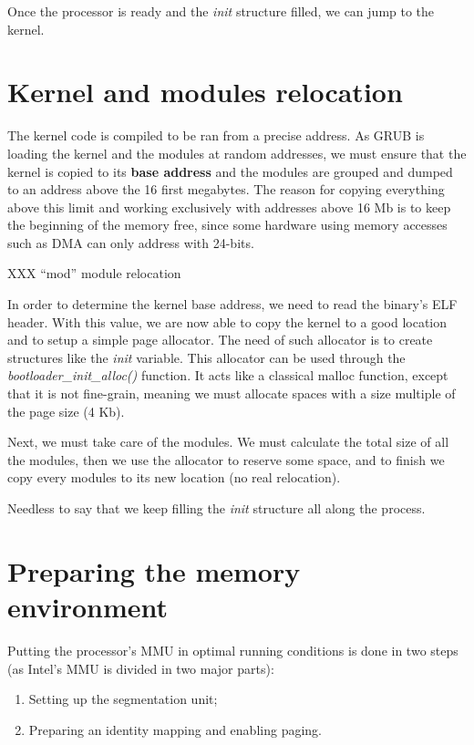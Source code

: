 Once the processor is ready and the \textit{init} structure filled, we
can jump to the kernel.

%
%

\section{Kernel and modules relocation}

The kernel code is compiled to be ran from a precise address. As GRUB
is loading the kernel and the modules at random addresses, we must
ensure that the kernel is copied to its \textbf{base address} and the
modules are grouped and dumped to an address above the 16 first
megabytes. The reason for copying everything above this limit and
working exclusively with addresses above 16 Mb is to keep the
beginning of the memory free, since some hardware using memory
accesses such as DMA can only address with 24-bits.

XXX ``mod'' module relocation

In order to determine the kernel base address, we need to read the
binary's ELF header. With this value, we are now able to copy the
kernel to a good location and to setup a simple page allocator. The
need of such allocator is to create structures like the \textit{init}
variable. This allocator can be used through the
\textit{bootloader\_init\_alloc()} function. It acts like a classical
malloc function, except that it is not fine-grain, meaning we must
allocate spaces with a size multiple of the page size (4 Kb).

Next, we must take care of the modules. We must calculate the total
size of all the modules, then we use the allocator to reserve some
space, and to finish we copy every modules to its new location (no
real relocation).

Needless to say that we keep filling the \textit{init} structure all
along the process.

%
%

\section{Preparing the memory environment}

Putting the processor's  MMU in optimal running conditions  is done in
two steps (as Intel's MMU is divided in two major parts):

\begin{enumerate}
  \item
    Setting up the segmentation unit;
  \item
    Preparing an identity mapping and enabling paging.
\end{enumerate}

